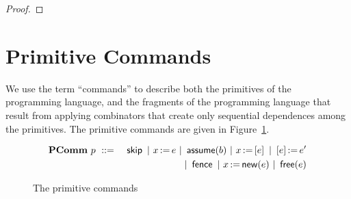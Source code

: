\documentclass[11pt]{report}
\begin{document}
\begin{proof}
  

\end{proof}




\section{Primitive Commands} %
\label{sec:primitive_commands}

We use the term ``commands'' to describe both the primitives of the programming language, and the fragments of the programming language that result from applying combinators that create only sequential dependences among the primitives. The primitive commands are given in Figure~\ref{fig:primitive-commands}. 

\begin{figure}[h]
	\centering
	\begin{eqnarray*}
		\mathbf{PComm}~p & ~::=~ & \operatorname{\mathsf{skip}} ~|~ x \operatorname{:\!=} e ~|~ \operatorname{\mathsf{assume}}(b) ~|~  x \operatorname{:\!=} \left[ e \right] ~|~ \left[ e \right] \operatorname{:\!=} e' \\
		& & ~|~ \operatorname{\mathsf{fence}} ~|~ x \operatorname{:\!=} \operatorname{\mathsf{new}}(e) ~|~ \operatorname{\mathsf{free}}(e)
	\end{eqnarray*}
	\caption{The primitive commands}
	\label{fig:primitive-commands}
\end{figure}
\end{document}
